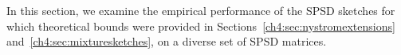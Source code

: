In this section, we examine the empirical performance of the SPSD sketches
for which theoretical bounds were provided in Sections~\ref{ch4:sec:nystromextensions}
and~\ref{ch4:sec:mixturesketches}, on a diverse set of SPSD matrices.
% 

